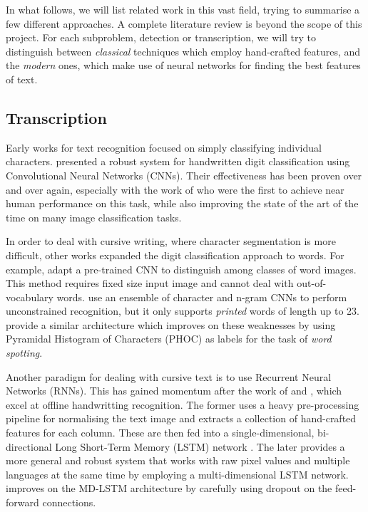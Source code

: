 	In what follows, we will list related work in this vast field, trying to summarise a few different approaches. A complete literature review is beyond the scope of this project. For each subproblem, detection or transcription, we will try to distinguish between \emph{classical} techniques which employ hand-crafted features, and the \emph{modern} ones, which make use of neural networks for finding the best features of text.


	\subsection{Transcription}
		Early works for text recognition focused on simply classifying individual characters.  presented a robust system for handwritten digit classification using Convolutional Neural Networks (CNNs). Their effectiveness has been proven over and over again, especially with the work of \citet{ciresan} who were the first to achieve near human performance on this task, while also improving the state of the art of the time on many image classification tasks.

		In order to deal with cursive writing, where character segmentation is more difficult, other works expanded the digit classification approach to words. For example, \citet{sharma2015adapting} adapt a pre-trained CNN to distinguish among classes of word images. This method requires fixed size input image and cannot deal with out-of-vocabulary words.  use an ensemble of character and n-gram CNNs to perform unconstrained recognition, but it only supports \emph{printed} words of length up to 23.  provide a similar architecture which improves on these weaknesses by using Pyramidal Histogram of Characters (PHOC) as labels for the task of \emph{word spotting}.

		Another paradigm for dealing with cursive text is to use Recurrent Neural Networks (RNNs). This has gained momentum after the work of \citet{graves_LSTM} and \citet{graves_MDLSTM}, which excel at offline handwritting recognition. The former uses a heavy pre-processing pipeline for normalising the text image and extracts a collection of hand-crafted features for each column. These are then fed into a single-dimensional, bi-directional Long Short-Term Memory (LSTM) network \citep{LSTM_original}. The later provides a more general and robust system that works with raw pixel values and multiple languages at the same time by employing a multi-dimensional LSTM network.  improves on the MD-LSTM architecture by carefully using dropout on the feed-forward connections.


